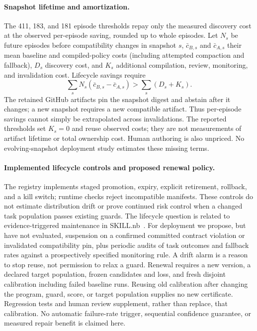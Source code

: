 \paragraph{Snapshot lifetime and amortization.}
\label{app:lifecycle}
The 411, 183, and 181 episode thresholds repay only the measured discovery
cost at the observed per-episode saving, rounded up to whole episodes.
Let $N_s$ be future episodes before compatibility changes in snapshot $s$,
$\bar c_{B,s}$ and $\bar c_{A,s}$ their mean baseline and compiled-policy
costs (including attempted compaction and fallback), $D_s$ discovery cost,
and $K_s$ additional compilation, review, monitoring, and invalidation cost.
Lifecycle savings require
\[
  \sum_s N_s(\bar c_{B,s}-\bar c_{A,s}) > \sum_s(D_s+K_s).
\]
The retained GitHub artifacts pin the snapshot digest and abstain after it
changes; a new snapshot requires a new compatible artifact. Thus per-episode
savings cannot simply be extrapolated across invalidations. The reported
thresholds set $K_s=0$ and reuse observed costs; they are not measurements of
artifact lifetime or total ownership cost. Human authoring is also unpriced.
No evolving-snapshot deployment study estimates these missing terms.

\paragraph{Implemented lifecycle controls and proposed renewal policy.}
The registry implements staged promotion, expiry, explicit retirement,
rollback, and a kill switch; runtime checks reject incompatible manifests.
These controls do not estimate distribution drift or prove continued risk
control when a changed task population passes existing guards. The lifecycle
question is related to evidence-triggered maintenance in
SKILL.nb~\citep{elhattami2026skillnb}.
For deployment we propose, but have not evaluated, suspension on a confirmed
committed contract violation or invalidated compatibility pin, plus periodic
audits of task outcomes and fallback rates against a prospectively specified
monitoring rule. A drift alarm is a reason to stop reuse, not permission to
relax a guard. Renewal requires a new version, a declared target population,
frozen candidates and loss, and fresh disjoint calibration including failed
baseline runs. Reusing old calibration after changing the program, guard,
score, or target population supplies no new certificate. Regression tests and
human review supplement, rather than replace, that calibration. No automatic
failure-rate trigger, sequential confidence guarantee, or measured repair
benefit is claimed here.

